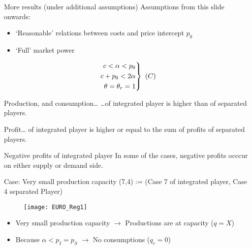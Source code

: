 \documentclass[aspectratio=169,t]{beamer}  %
\begin{document}
\begin{frame}{More results (under additional assumptions)}
Assumptions from this slide onwards:
\begin{itemize}
\item `Reasonable' relations between costs  and price intercept $p_0$
\item `Full' market power  
\end{itemize}
\vspace{-2ex}
\begin{equation*}
 \left.
 \begin{aligned} \centering
      c<\alpha<p_0 & \\
      c+p_0<2\alpha& \\
      \theta=\theta_r=1 &
 \end{aligned}
\right\}\ (C)
\end{equation*}
\vspace{-1ex}
\begin{block}{Production, and consumption\ldots}
\ldots of integrated player is higher than of separated players.
\end{block}


\begin{block}{Profit\ldots}
of integrated player is higher or equal to the sum of profits of separated players. 
\end{block}

\begin{block}{Negative profits of integrated player}
    In some of the cases, negative profits occcur on either supply or demand side.
\end{block}

\end{frame}


\begin{frame}{Case: Very small production capacity}
(7,4) := (Case 7 of integrated player, Case 4 separated Player)
\begin{figure}
     \texttt{[image: EURO\_Reg1]}
\end{figure}
\begin{itemize}
   \item Very small production capacity $\to$ Productions are at capacity ($q=X$) 
    \item Because $\alpha < p_I = p_S$ $\to$ No consumptions ($q_r=0$)
\end{itemize}
\end{frame}
\end{document}
